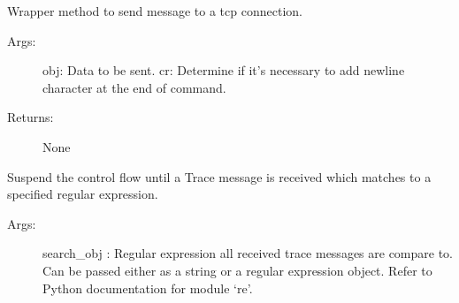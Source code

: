 \documentclass[letterpaper,10pt,english]{sphinxmanual}
\begin{document}
\begin{fulllineitems}
\begin{fulllineitems}
\label{\detokenize{QConnectBase:QConnectBase.connection_base.ConnectionBase.send_obj}}
\sphinxAtStartPar
Wrapper method to send message to a tcp connection.
\begin{description}
\item[{Args:}] \leavevmode
\sphinxAtStartPar
obj: Data to be sent.
cr: Determine if it’s necessary to add newline character at the end of command.

\item[{Returns:}] \leavevmode
\sphinxAtStartPar
None

\end{description}

\end{fulllineitems}


\begin{fulllineitems}
\label{\detokenize{QConnectBase:QConnectBase.connection_base.ConnectionBase.supported_devices}}
\end{fulllineitems}


\begin{fulllineitems}
\label{\detokenize{QConnectBase:QConnectBase.connection_base.ConnectionBase.wait_4_trace}}
\sphinxAtStartPar
Suspend the control flow until a Trace message is received which matches to a specified regular expression.
\begin{description}
\item[{Args:}] \leavevmode
\sphinxAtStartPar
search\_obj : Regular expression all received trace messages are compare to.           Can be passed either as a string or a regular expression object. Refer to Python documentation for module ‘re’.


\end{description}
\end{fulllineitems}
\end{fulllineitems}
\end{document}
